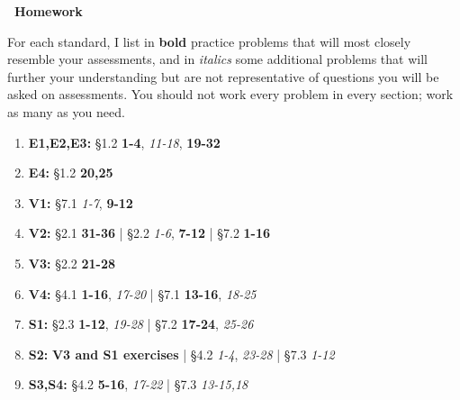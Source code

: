 \documentclass{article}
\begin{document}
\begin{center}
{\Large \bf \course\  Homework} \\
\sem
\end{center}

\newcommand{\closeExamples}{\textbf}
\newcommand{\otherExamples}{\textit}
\newcommand{\standards}[1]{\item[\textbf{#1}]}

For each standard, I list in \closeExamples{bold} practice problems that will most closely resemble your assessments, and in \otherExamples{italics} some additional problems that will further your understanding but are not representative of questions you will be asked on assessments.  You should not work every problem in every section; work as many as you need.

\begin{enumerate}
  \standards{E1,E2,E3:} \S 1.2
    \closeExamples{1-4},
    \otherExamples{11-18},
    \closeExamples{19-32}

  \standards{E4:} \S 1.2
    \closeExamples{20,25}

  \standards{V1:} \S 7.1
    \otherExamples{1-7},
    \closeExamples{9-12}

  \standards{V2:} \S 2.1
    \closeExamples{31-36}
    | \S 2.2
    \otherExamples{1-6},
    \closeExamples{7-12}
    | \S 7.2
    \closeExamples{1-16}

  \standards{V3:} \S 2.2
    \closeExamples{21-28}

  \standards{V4:} \S 4.1
    \closeExamples{1-16},
    \otherExamples{17-20}
    | \S 7.1
    \closeExamples{13-16},
    \otherExamples{18-25}

  \standards{S1:} \S 2.3
    \closeExamples{1-12},
    \otherExamples{19-28}
    | \S 7.2
    \closeExamples{17-24},
    \otherExamples{25-26}

  \standards{S2:}
    \closeExamples{\textbf{V3} and \textbf{S1} exercises}
    | \S 4.2
    \otherExamples{1-4},
    \otherExamples{23-28}
    | \S 7.3
    \otherExamples{1-12}

  \standards{S3,S4:} \S 4.2
    \closeExamples{5-16},
    \otherExamples{17-22}
    | \S 7.3
    \otherExamples{13-15,18}
\end{enumerate}
\end{document}

